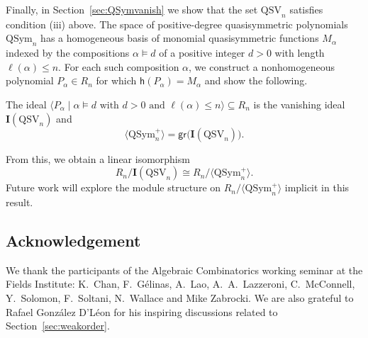 \documentclass[12pt]{amsart}
\theoremstyle{definition}
\theoremstyle{remark}
\numberwithin{equation}{section}
\newenvironment{introthm}[1]{
  \renewcommand\theequation{#1}
  \thm
}{\endthm}
\newcommand{\QSym}{\mathrm{QSym}}
\newcommand{\QSV}{\mathrm{QSV}}
\begin{document}
Finally, in Section~\ref{sec:QSymvanish} we show that the set $\QSV_{n}$ satisfies condition (iii) above.  
The space of positive-degree quasisymmetric polynomials $\QSym_{n}$ has a homogeneous basis of monomial quasisymmetric functions $M_{\alpha}$ indexed by the compositions $\alpha \vDash d$ of a positive integer $d > 0$ with length $\ell(\alpha) \le n$.  
For each such composition $\alpha$, we construct a nonhomogeneous polynomial $P_{\alpha} \in R_{n}$ for which $\mathsf{h}(P_{\alpha}) = M_{\alpha}$ and show the following.

\begin{introthm}{\ref{thm:vanishingQSV}}
The ideal $\langle P_{\alpha} \;|\; \text{$\alpha \vDash d $ with $d> 0$ and $\ell(\alpha) \le n$} \rangle \subseteq R_n$ is the vanishing ideal $\mathbf{I}(\QSV_n)$ and 
\[
 \langle \QSym_{n}^{+} \rangle = \mathsf{gr}\big(\mathbf{I}(\QSV_{n})\big).
\]
\end{introthm}

From this, we obtain a linear isomorphism
\[
R_{n}\big/\mathbf{I}(\QSV_{n}) \cong R_{n}\big/\langle \QSym_{n}^{+} \rangle.
\]
Future work will explore the module structure on $R_{n}\big/\langle \QSym_{n}^{+} \rangle$ implicit in this result.

\subsection{Acknowledgement} 
We thank the participants of the Algebraic Combinatorics working seminar at the Fields Institute: K.~Chan, F.~G\'elinas, A.~Lao, A.~A.~Lazzeroni, C.~McConnell, Y.~Solomon, F.~Soltani,  N.~Wallace and Mike Zabrocki.
We are also grateful to Rafael Gonz\'alez D'L\'eon for his  inspiring discussions related to Section~\ref{sec:weakorder}. 
\end{document}
